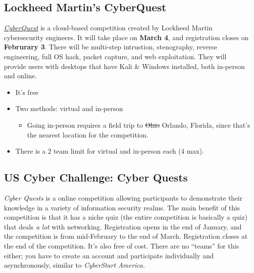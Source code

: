 \documentclass[
  letterpaper,
  DIV=11,
  numbers=noendperiod]{scrartcl}
\providecommand{\tightlist}{%
  \setlength{\itemsep}{0pt}\setlength{\parskip}{0pt}}\usepackage{longtable,booktabs,array}
\begin{document}
\hypertarget{lockheed-martins-cyberquest}{%
\subsection{Lockheed Martin's
CyberQuest}\label{lockheed-martins-cyberquest}}

\href{https://www.lockheedmartin.com/en-us/who-we-are/communities/cyber-quest.html}{\emph{CyberQuest}} is a cloud-based competition created by Lockheed Martin cybersecurity engineers. It will take place on \textbf{March 4}, and registration closes on \textbf{Februrary 3}. There will be multi-step intrustion, stenography, reverse engineering, full OS hack, packet capture, and web exploitation. They will provide users with desktops that have Kali \& Windows installed, both in-person and online.

\begin{itemize}
\tightlist
\item
  It's free
\item
  Two methods: virtual and in-person

  \begin{itemize}
  \tightlist
  \item
    Going in-person requires a field trip to \st{Ohio} Orlando, Florida,
    since that's the nearest location for the competition.
  \end{itemize}
\item
  There is a 2 team limit for virtual and in-person each (4 max).
\end{itemize}

\hypertarget{us-cyber-challenge-cyber-quests}{%
\subsection{US Cyber Challenge: Cyber
Quests}\label{us-cyber-challenge-cyber-quests}}

\emph{Cyber Quests} is a online competition allowing participants to
demonstrate their knowledge in a variety of information security realms.
The main benefit of this competition is that it has a niche quiz (the
entire competition is basically a quiz) that deals \emph{a lot} with
networking. Registration opens in the end of January, and the
competition is from mid-February to the end of March. Registration
closes at the end of the competition. It's also free of cost. There are
no ``teams'' for this either; you have to create an account and
participate individually and asynchronously, similar to \emph{CyberStart
America.}
\end{document}
